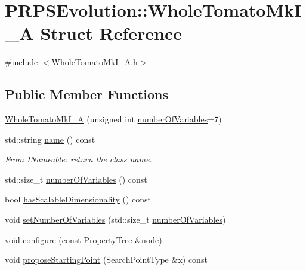\hypertarget{struct_p_r_p_s_evolution_1_1_whole_tomato_mk_i___a}{\section{\-P\-R\-P\-S\-Evolution\-:\-:\-Whole\-Tomato\-Mk\-I\-\_\-\-A \-Struct \-Reference}
\label{struct_p_r_p_s_evolution_1_1_whole_tomato_mk_i___a}
}


{\ttfamily \#include $<$\-Whole\-Tomato\-Mk\-I\-\_\-\-A.\-h$>$}

\subsection*{\-Public \-Member \-Functions}
\begin{DoxyCompactItemize}
\item 
\hyperlink{struct_p_r_p_s_evolution_1_1_whole_tomato_mk_i___a_a28cabdac33c7c4ded75a0c69a1a71c14}{\-Whole\-Tomato\-Mk\-I\-\_\-\-A} (unsigned int \hyperlink{struct_p_r_p_s_evolution_1_1_whole_tomato_mk_i___a_adb8cb3319a6f2b7ecd12fe01902b2678}{number\-Of\-Variables}=7)
\item 
std\-::string \hyperlink{struct_p_r_p_s_evolution_1_1_whole_tomato_mk_i___a_a146d474b17124b6691c1765787e8bc6a}{name} () const 
\begin{DoxyCompactList}\small\item\em \-From \-I\-Nameable\-: return the class name. \end{DoxyCompactList}\item 
std\-::size\-\_\-t \hyperlink{struct_p_r_p_s_evolution_1_1_whole_tomato_mk_i___a_adb8cb3319a6f2b7ecd12fe01902b2678}{number\-Of\-Variables} () const 
\item 
bool \hyperlink{struct_p_r_p_s_evolution_1_1_whole_tomato_mk_i___a_a466bf3ceecf1664b3662205818157f19}{has\-Scalable\-Dimensionality} () const 
\item 
void \hyperlink{struct_p_r_p_s_evolution_1_1_whole_tomato_mk_i___a_a5c56bf1a22268e4f28037b326d93ce9c}{set\-Number\-Of\-Variables} (std\-::size\-\_\-t \hyperlink{struct_p_r_p_s_evolution_1_1_whole_tomato_mk_i___a_adb8cb3319a6f2b7ecd12fe01902b2678}{number\-Of\-Variables})
\item 
void \hyperlink{struct_p_r_p_s_evolution_1_1_whole_tomato_mk_i___a_a82c7783dec61c8e2b7d3ae49e6b3a029}{configure} (const \-Property\-Tree \&node)
\item 
void \hyperlink{struct_p_r_p_s_evolution_1_1_whole_tomato_mk_i___a_a3b72283a1593cb65c859d422209e5445}{propose\-Starting\-Point} (\-Search\-Point\-Type \&x) const 

\end{DoxyCompactItemize}

